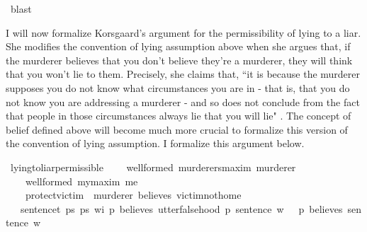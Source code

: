 \begin{isabellebody}
\ blast\isanewline
\ \isamarkupfalse%
%
\endisatagproof
{\isafoldproof}%
%
\isadelimproof
%
\endisadelimproof
%
\begin{isamarkuptext}%
I will now formalize Korsgaard's argument for the permissibility of lying to a liar. She modifies
the convention of lying assumption above when she argues that, if the murderer believes that you don't 
believe they're a murderer, they will think that you won't lie to them. Precisely, she claims that, 
``it is because the murderer supposes you do not know what circumstances you are in - that is, that 
you do not know you are addressing a murderer - and so does not conclude from the fact that people 
in those circumstances always lie that you will lie" \cite[6]{KorsgaardRTL}. The concept of belief 
defined above will become much more crucial to formalize this version of the convention of lying 
assumption. I formalize this argument below.%
\end{isamarkuptext}\isamarkuptrue%
\isamarkupfalse%
\ lying{\isacharunderscore}to{\isacharunderscore}liar{\isacharunderscore}permissible{\isacharcolon}\isanewline
\ \ \ {\isachardoublequoteopen}{\isasymTurnstile}\ {\isacharparenleft}well{\isacharunderscore}formed\ murderers{\isacharunderscore}maxim\ murderer{\isacharparenright}{\isachardoublequoteclose}\isanewline
\ \ \ {\isachardoublequoteopen}{\isasymTurnstile}\ {\isacharparenleft}well{\isacharunderscore}formed\ my{\isacharunderscore}maxim\ me{\isacharparenright}{\isachardoublequoteclose}\isanewline
%
\isanewline
\ \ \ {\isachardoublequoteopen}{\isasymTurnstile}\ {\isacharparenleft}protect{\isacharunderscore}victim\ \isactrlbold {\isasymrightarrow}\ {\isacharparenleft}murderer\ believes\ victim{\isacharunderscore}not{\isacharunderscore}home{\isacharparenright}{\isacharparenright}{\isachardoublequoteclose}\isanewline
%
\isanewline
\ \ \ {\isachardoublequoteopen}{\isasymforall}sentence{\isacharcolon}{\isacharcolon}t{\isachardot}\ {\isasymforall}p{}{\isacharcolon}{\isacharcolon}s{\isachardot}\ {\isasymforall}p{}{\isacharcolon}{\isacharcolon}s{\isachardot}\ {\isasymforall}w{\isacharcolon}{\isacharcolon}i{\isachardot}\ {\isacharparenleft}{\isacharparenleft}p{}\ believes\ {\isacharparenleft}utter{\isacharunderscore}falsehood\ p{}\ sentence{\isacharparenright}{\isacharparenright}\ w{\isacharparenright}\ {\isasymlongrightarrow}\ {\isacharparenleft}{\isasymnot}\ {\isacharparenleft}p{}\ believes\ sentence{\isacharparenright}\ w{\isacharparenright}{\isachardoublequoteclose}\isanewline

\end{isabellebody}
